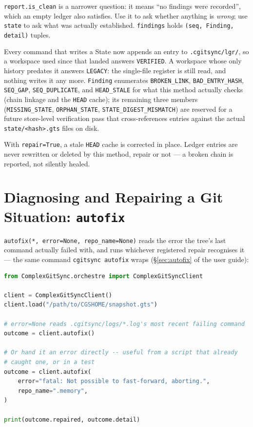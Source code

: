 \texttt{report.is\_clean} is a narrower question: it means ``no findings
were recorded'', which an empty ledger also satisfies. Use it to ask
whether anything is \emph{wrong}; use \texttt{state} to ask what was
actually established. \texttt{findings} holds \texttt{(seq, Finding,
detail)} tuples.

Every command that writes a State now appends an entry to
\texttt{.cgitsync/lgr/}, so a workspace used since that landed answers
\texttt{VERIFIED}. A workspace whose only history predates it answers
\texttt{LEGACY}: the single-file register is still read, and nothing writes
it any more.  \texttt{Finding} enumerates
\texttt{BROKEN\_LINK}, \texttt{BAD\_ENTRY\_HASH}, \texttt{SEQ\_GAP},
\texttt{SEQ\_DUPLICATE}, and \texttt{HEAD\_STALE} for what this method
actually checks (chain linkage and the \texttt{HEAD} cache); its remaining
three members (\texttt{MISSING\_STATE}, \texttt{ORPHAN\_STATE},
\texttt{STATE\_DIGEST\_MISMATCH}) are reserved for a future store-level
verification pass that cross-references entries against the actual
\texttt{state/<hash>.gts} files on disk.

With \texttt{repair=True}, a stale \texttt{HEAD} cache is corrected in
place. Ledger entries are never rewritten or deleted by this method,
repair or not — a broken chain is reported, not silently healed.

\section{Diagnosing and Repairing a Git Situation: \texttt{autofix}}
\label{sec:api-autofix}

\texttt{autofix(*, error=None, repo\_name=None)} reads the error the
tree's last command actually failed with, and runs whichever registered
repair recognises it --- the same command \texttt{cgitsync autofix}
wraps (\S\ref{sec:autofix} of the user guide):

\begin{lstlisting}[language=python]
from ComplexGitSync.orchestre import ComplexGitSyncClient

client = ComplexGitSyncClient()
client.load("/path/to/CGSHOME/snapshot.gts")

# error=None reads .cgitsync/logs/*.log's most recent failing command
outcome = client.autofix()

# Or hand it an error directly -- useful from a script that already
# caught one, or in a test
outcome = client.autofix(
    error="fatal: Not possible to fast-forward, aborting.",
    repo_name=".memory",
)

print(outcome.repaired, outcome.detail)
\end{lstlisting}

